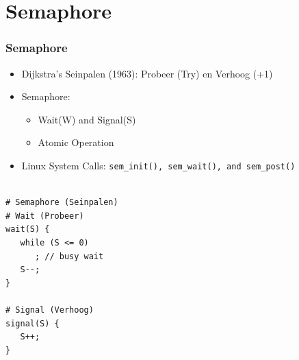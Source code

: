 \documentclass[xcolor=table, notheorems, hyperref={pdfpagelabels=false}]{beamer}
\begin{document}
\section{Semaphore}
\begin{frame}[fragile]
\frametitle{Semaphore}
\begin{itemize}
\item Dijkstra's Seinpalen (1963): Probeer (Try) en Verhoog (+1)
\item Semaphore:
\begin{itemize}
\item Wait(W) and Signal(S)
\item Atomic Operation
\end{itemize}
\item Linux System Calls: \texttt{sem\_init(), sem\_wait(), and sem\_post()}
\end{itemize}

\begin{lstlisting}[basicstyle=\ttfamily\footnotesize]

# Semaphore (Seinpalen)
# Wait (Probeer)
wait(S) {
   while (S <= 0)
      ; // busy wait
   S--;
}

# Signal (Verhoog)
signal(S) {
   S++;
}

\end{lstlisting}

\end{frame}

\end{document}
